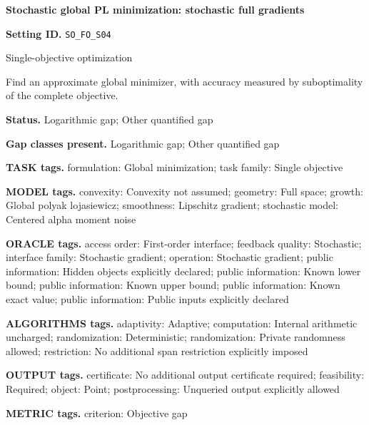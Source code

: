 \documentclass[10pt,a4paper]{article}
\begin{document}
\raggedright

{\LARGE\bfseries\sffamily\color{AtlasNavy} Stochastic global PL minimization: stochastic full gradients\par}\vspace{5pt}


\textbf{Setting ID.} \texttt{SO\_\allowbreak{}FO\_\allowbreak{}S04}



Single-objective optimization



Find an approximate global minimizer, with accuracy measured by suboptimality of the complete objective.



\textbf{Status.} Logarithmic gap; Other quantified gap



\textbf{Gap classes present.} Logarithmic gap; Other quantified gap



\textbf{TASK tags.} formulation: Global minimization; task family: Single objective



\textbf{MODEL tags.} convexity: Convexity not assumed; geometry: Full space; growth: Global polyak lojasiewicz; smoothness: Lipschitz gradient; stochastic model: Centered alpha moment noise



\textbf{ORACLE tags.} access order: First-order interface; feedback quality: Stochastic; interface family: Stochastic gradient; operation: Stochastic gradient; public information: Hidden objects explicitly declared; public information: Known lower bound; public information: Known upper bound; public information: Known exact value; public information: Public inputs explicitly declared



\textbf{ALGORITHMS tags.} adaptivity: Adaptive; computation: Internal arithmetic uncharged; randomization: Deterministic; randomization: Private randomness allowed; restriction: No additional span restriction explicitly imposed



\textbf{OUTPUT tags.} certificate: No additional output certificate required; feasibility: Required; object: Point; postprocessing: Unqueried output explicitly allowed



\textbf{METRIC tags.} criterion: Objective gap
\end{document}
